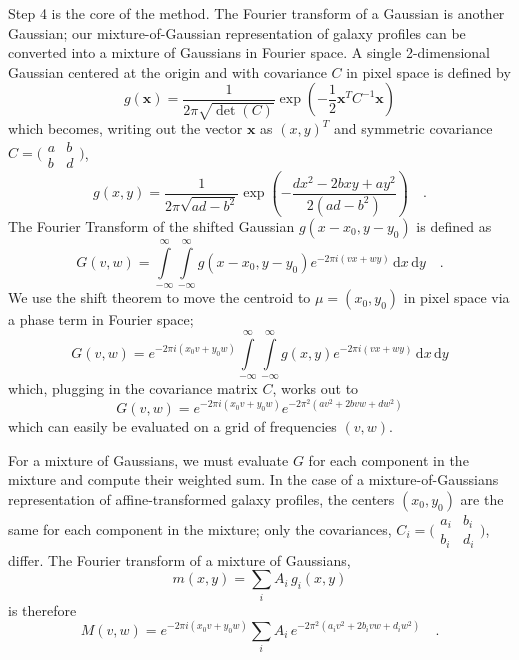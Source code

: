 \documentclass[11pt,preprint]{aastex}
\newcommand{\trick}{method}
\begin{document}
Step 4 is the core of the \trick.  The Fourier transform of
a Gaussian is another Gaussian; our mixture-of-Gaussian representation
of galaxy profiles can be converted into a mixture of Gaussians in
Fourier space.
%
A single 2-dimensional Gaussian
centered at the origin and
with covariance $C$
in pixel space is defined by
\begin{equation}
g(\bm{x}) = \frac{1}{2 \pi \sqrt{\det(C)}}
\exp\left( -\frac{1}{2} \bm{x}^T C^{-1} \bm{x} \right)
\end{equation}
which becomes, writing out the vector $\bm{x}$ as $(x,y)^T$
and symmetric covariance $C = \bigl(\begin{smallmatrix}
a&b \\ b&d
\end{smallmatrix} \bigr)$,
\begin{equation}
g(x, y) = \frac{1}{2 \pi \sqrt{a d - b^2}}
\exp \left(
-\frac{d x^2 - 2 b x y + a y^2}{2(a d - b^2)}
\right) \quad .
\end{equation}
%
The Fourier Transform of the shifted Gaussian $g(x - x_0, y - y_0)$ is defined as
\begin{equation}
G(v,w) =
\int\limits_{-\infty}^{\infty}
\int\limits_{-\infty}^{\infty}
g(x - x_0, y - y_0) e^{-2 \pi i (v x + w y)} \, \mathrm{d}x \, \mathrm{d}y
\quad .
\end{equation}
We use the shift theorem to move the centroid to $\mu = (x_0, y_0)$
in pixel space via a phase term in Fourier space;
\begin{equation}
G(v, w) =
e^{-2 \pi i (x_0 v + y_0 w)}
\int\limits_{-\infty}^{\infty}
\int\limits_{-\infty}^{\infty}
g(x, y) e^{-2 \pi i (v x + w y)} \, \mathrm{d}x \, \mathrm{d}y
\end{equation}
%
which, plugging in the covariance matrix $C$, works out to
\begin{equation}
G(v,w) =
e^{-2 \pi i (x_0 v + y_0 w)}
e^{-2 \pi^2 (a v^2 + 2 b v w + d w^2)}
\end{equation}
which can easily be evaluated on a grid of frequencies $(v, w)$.

For a mixture of Gaussians, we must evaluate $G$ for each component in
the mixture and compute their weighted sum.  In the case of a
mixture-of-Gaussians representation of affine-transformed galaxy
profiles, the centers $(x_0, y_0)$ are the same for each component in
the mixture; only the covariances,
$C_i = \bigl(\begin{smallmatrix}
a_i&b_i \\ b_i&d_i
\end{smallmatrix} \bigr)$,
differ.  The Fourier transform
of a mixture of Gaussians,
\begin{equation}
m(x,y) = \sum_i A_i \, g_i(x, y)
\end{equation}
is therefore
\begin{equation}
M(v, w) = e^{-2 \pi i (x_0 v + y_0 w)}
\sum_i A_i \,
e^{-2 \pi^2 (a_i v^2 + 2 b_i v w + d_i w^2)}
\quad .
\end{equation}
\end{document}

